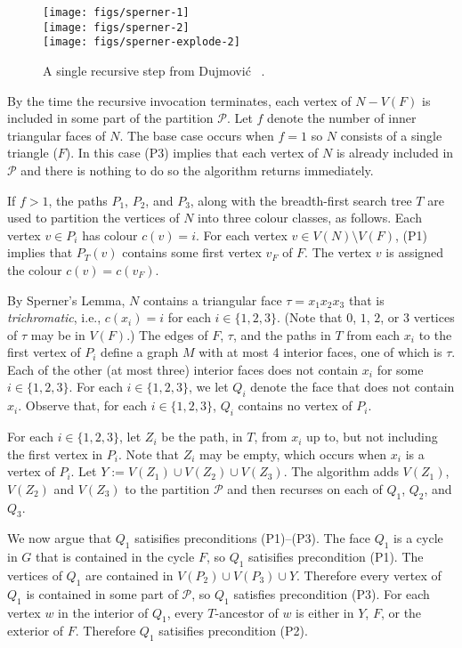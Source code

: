 \documentclass[kpfonts]{patmorin}
\begin{document}
\begin{figure}
  \begin{center}
    \texttt{[image: figs/sperner-1]} \\[1ex]
    \texttt{[image: figs/sperner-2]} \\[1ex]
    \texttt{[image: figs/sperner-explode-2]}
  \end{center}
  \caption{A single recursive step from Dujmović \etal\  \cite{dujmovic.joret.ea:planar}.}
\end{figure}

By the time the recursive invocation terminates, each vertex of $N-V(F)$ is included in some part of the partition $\mathcal{P}$. Let $f$ denote the number of inner triangular faces of $N$.  The base case occurs when $f=1$ so $N$ consists of a single triangle ($F$).  In this case (P3) implies that each vertex of $N$ is already included in $\mathcal{P}$ and there is nothing to do so the algorithm returns immediately.

If $f>1$, the paths $P_1$, $P_2$, and $P_3$, along with the breadth-first search tree $T$ are used to partition the vertices of $N$ into three colour classes, as follows.  Each vertex $v\in P_i$ has colour $c(v)=i$.  For each vertex $v\in V(N)\setminus V(F)$, (P1) implies that $P_T(v)$ contains some first vertex $v_F$ of $F$.  The vertex $v$ is assigned the colour $c(v)=c(v_F)$.

By Sperner's Lemma, $N$ contains a triangular face $\tau=x_1x_2x_3$ that is \emph{trichromatic}, i.e., $c(x_i)=i$ for each $i\in\{1,2,3\}$. (Note that $0$, $1$, $2$, or $3$ vertices of $\tau$ may be in $V(F)$.)  The edges of $F$, $\tau$, and the paths in $T$ from each $x_i$ to the first vertex of $P_i$ define a graph $M$ with at most 4 interior faces, one of which is $\tau$.  Each of the other (at most three) interior faces does not contain $x_i$ for some $i\in\{1,2,3\}$. For each $i\in\{1,2,3\}$, we let $Q_i$ denote the face that does not contain $x_i$. Observe that, for each $i\in\{1,2,3\}$, $Q_i$ contains no vertex of $P_i$.

For each $i\in\{1,2,3\}$, let $Z_i$ be the path, in $T$, from $x_i$ up to, but not including the first vertex in $P_i$.  Note that $Z_i$ may be empty, which occurs when $x_i$ is a vertex of $P_i$.  Let $Y:=V(Z_1)\cup V(Z_2)\cup V(Z_3)$.  The algorithm adds $V(Z_1)$, $V(Z_2)$ and $V(Z_3)$ to the partition $\mathcal{P}$ and then recurses on each of $Q_1$, $Q_2$, and $Q_3$.

We now argue that $Q_1$ satisifies preconditions (P1)--(P3). The face $Q_1$ is a cycle in $G$ that is contained in the cycle $F$, so $Q_1$ satisifies precondition (P1).  The vertices of $Q_1$ are contained in $V(P_2)\cup V(P_3)\cup Y$.  Therefore every vertex of $Q_1$ is contained in some part of $\mathcal{P}$, so $Q_1$ satisfies precondition (P3).  For each vertex $w$ in the interior of $Q_1$, every $T$-ancestor of $w$ is either in $Y$, $F$, or the exterior of $F$.  Therefore $Q_1$ satisifies precondition (P2).
\end{document}
